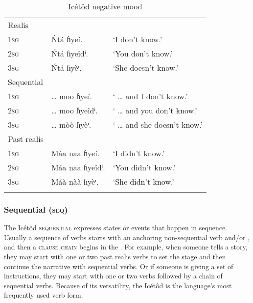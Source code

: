 \begin{table}
\caption{Icétôd negative mood}
\label{tab:verbs:neg}


\begin{tabularx}{\textwidth}{XXl}
\lsptoprule

Realis &  & \\
\textsc{1sg} & \'{N}tá ɦyeí. & ‘I don’t know.’\\
\textsc{2sg} & \'{N}tá ɦyeîdⁱ. & ‘You don’t know.’\\
\textsc{3sg} & \'{N}tá ɦyèⁱ. & ‘She doesn’t know.’\\
\tablevspace
Sequential &  & \\
\textsc{1sg} & {\dots} moo ɦyeí. & ‘ {\dots} and I don’t know.’\\
\textsc{2sg} & {\dots} moo ɦyeîdⁱ. & ‘ {\dots} and you don’t know.’\\
\textsc{3sg} & {\dots} mòò ɦyèⁱ. & ‘ {\dots} and she doesn’t know.’\\
\tablevspace
Past realis &  & \\
\textsc{1sg} & Máa naa ɦyeí. & ‘I didn’t know.’\\
\textsc{2sg} & Máa naa ɦyeîdⁱ. & ‘You didn’t know.’\\
\textsc{3sg} & Máà nàà ɦyèⁱ. & ‘She didn’t know.’\\
\lspbottomrule
\end{tabularx}
\end{table}

\subsubsection{Sequential (\textsc{seq})}\label{sec:8.10.7}

The Icétôd \textsc{sequential}  expresses states or events that happen in sequence. Usually a sequence of verbs starts with an anchoring non-sequential verb and/or , and then a \textsc{clause} \textsc{chain} begins in the . For example, when someone tells a story, they may start with one or two past  realis verbs to set the stage and then continue the narrative with sequential verbs. Or if someone is giving a set of instructions, they may start with one or two  verbs followed by a chain of sequential verbs. Because of its versatility, the Icétôd  is the language’s most frequently used verb form.

